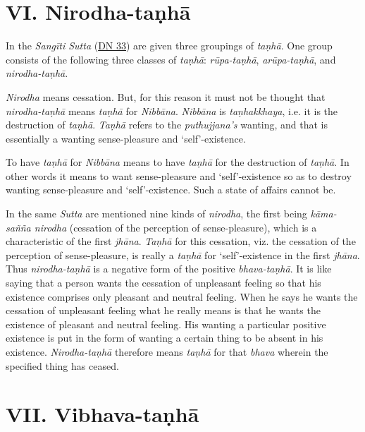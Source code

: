 \hypertarget{_vi_nirodha_taux1e47hux101}{%
\section{VI. Nirodha-taṇhā}\label{_vi_nirodha_taux1e47hux101}}

In the \emph{Sangīti Sutta} (\href{https://suttacentral.net/dn33/en/sujato}{DN 33}) are given three groupings of \emph{taṇhā}. One group consists of the following three classes of \emph{taṇhā}: \emph{rūpa-taṇhā}, \emph{arūpa-taṇhā}, and \emph{nirodha-taṇhā}.

\emph{Nirodha} means cessation. But, for this reason it must not be thought that \emph{nirodha-taṇhā} means \emph{taṇhā} for \emph{Nibbāna}. \emph{Nibbāna} is \emph{taṇhakkhaya}, i.e. it is the destruction of \emph{taṇhā}. \emph{Taṇhā} refers to the \emph{puthujjana's} wanting, and that is essentially a wanting sense-pleasure and `self'-existence.

To have \emph{taṇhā} for \emph{Nibbāna} means to have \emph{taṇhā} for the destruction of \emph{taṇhā}. In other words it means to want sense-pleasure and `self'-existence so as to destroy wanting sense-pleasure and `self'-existence. Such a state of affairs cannot be.

In the same \emph{Sutta} are mentioned nine kinds of \emph{nirodha}, the first being \emph{kāma-sañña nirodha} (cessation of the perception of sense-pleasure), which is a characteristic of the first \emph{jhāna}. \emph{Taṇhā} for this cessation, viz. the cessation of the perception of sense-pleasure, is really a \emph{taṇhā} for `self'-existence in the first \emph{jhāna}. Thus \emph{nirodha-taṇhā} is a negative form of the positive \emph{bhava-taṇhā}. It is like saying that a person wants the cessation of unpleasant feeling so that his existence comprises only pleasant and neutral feeling. When he says he wants the cessation of unpleasant feeling what he really means is that he wants the existence of pleasant and neutral feeling. His wanting a particular positive existence is put in the form of wanting a certain thing to be absent in his existence. \emph{Nirodha-taṇhā} therefore means \emph{taṇhā} for that \emph{bhava} wherein the specified thing has ceased.

\hypertarget{_vii_vibhava_taux1e47hux101}{%
\section{VII. Vibhava-taṇhā}\label{_vii_vibhava_taux1e47hux101}}

